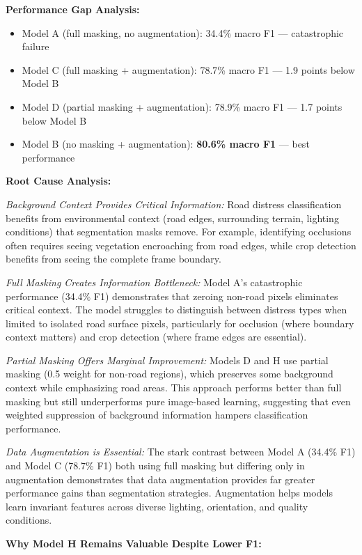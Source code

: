 \documentclass[12pt]{article}
\begin{document}
\textbf{Performance Gap Analysis:}
\begin{itemize}[itemsep=1pt,parsep=0pt,topsep=2pt]
\item Model A (full masking, no augmentation): 34.4\% macro F1 — catastrophic failure
\item Model C (full masking + augmentation): 78.7\% macro F1 — 1.9 points below Model B
\item Model D (partial masking + augmentation): 78.9\% macro F1 — 1.7 points below Model B
\item Model B (no masking + augmentation): \textbf{80.6\% macro F1} — best performance
\end{itemize}

\textbf{Root Cause Analysis:}

\textit{Background Context Provides Critical Information:} Road distress classification benefits from environmental context (road edges, surrounding terrain, lighting conditions) that segmentation masks remove. For example, identifying occlusions often requires seeing vegetation encroaching from road edges, while crop detection benefits from seeing the complete frame boundary.

\textit{Full Masking Creates Information Bottleneck:} Model A's catastrophic performance (34.4\% F1) demonstrates that zeroing non-road pixels eliminates critical context. The model struggles to distinguish between distress types when limited to isolated road surface pixels, particularly for occlusion (where boundary context matters) and crop detection (where frame edges are essential).

\textit{Partial Masking Offers Marginal Improvement:} Models D and H use partial masking (0.5 weight for non-road regions), which preserves some background context while emphasizing road areas. This approach performs better than full masking but still underperforms pure image-based learning, suggesting that even weighted suppression of background information hampers classification performance.

\textit{Data Augmentation is Essential:} The stark contrast between Model A (34.4\% F1) and Model C (78.7\% F1) both using full masking but differing only in augmentation demonstrates that data augmentation provides far greater performance gains than segmentation strategies. Augmentation helps models learn invariant features across diverse lighting, orientation, and quality conditions.

\textbf{Why Model H Remains Valuable Despite Lower F1:}
\end{document}
